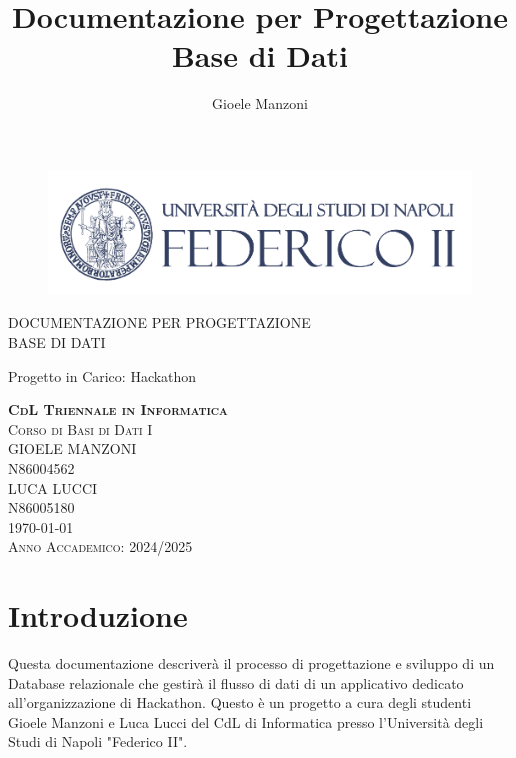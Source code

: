 \documentclass[a4paper, 11pt]{article}
\author{Gioele Manzoni}
\title{Documentazione per Progettazione Base di Dati}
\begin{document}
	\begin{center}
		\begin{figure}[hb]
			\includegraphics[width=1\textwidth]{../Immagini/coverpic.png}
		\end{figure}
		{\LARGE DOCUMENTAZIONE PER PROGETTAZIONE \\BASE DI DATI \par}
		{\Large{Progetto in Carico: Hackathon \par}}
		\vfill
		{\large{\textbf{\textsc{CdL Triennale in Informatica}}}}\\
		{\large{\textsc{Corso di Basi di Dati I}}}\\
		{\large{\textsc{GIOELE MANZONI}}}\\
		{\large{\textsc{N86004562}}}\\
		{\large{\textsc{LUCA LUCCI}}}\\
		{\large{\textsc{N86005180}}}\\
		{\large{\textsc{\today}}}\\
		\Large{\textsc{Anno Accademico: 2024/2025}}
	\end{center}
	\newpage
	\tableofcontents
	\newpage
	\section{Introduzione}
	Questa documentazione descriverà il processo di progettazione e sviluppo di un Database relazionale che gestirà il flusso di dati di un applicativo dedicato all'organizzazione di Hackathon. Questo è un progetto a cura degli studenti Gioele Manzoni e Luca Lucci del CdL di Informatica presso l'Università degli Studi di Napoli "Federico II".
\end{document}
